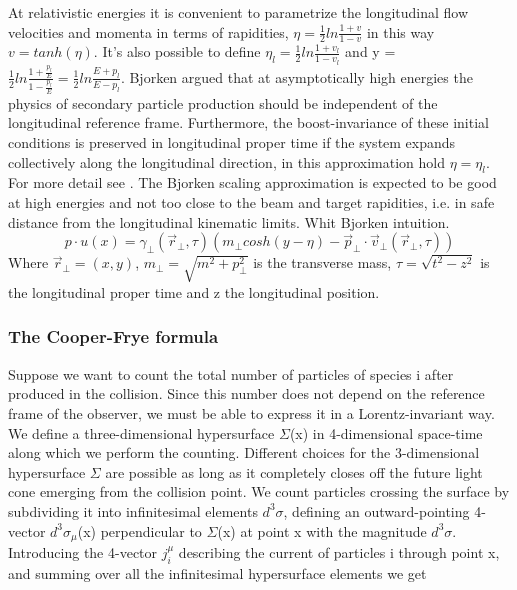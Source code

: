 \documentclass[12pt,a4paper]{book}
\begin{document}
	At relativistic energies it is convenient to parametrize the longitudinal flow velocities and momenta in terms of rapidities, $\eta= \frac{1}{2} ln \frac{1+v}{1-v}$ in this way $v = tanh (\eta)$. It's also possible to define $\eta_l = \frac{1}{2} ln \frac{1+v_l}{1-v_l}$ and y = $\frac{1}{2} ln \frac{1+\frac{p_l}{E}}{1-\frac{p_l}{E}}= \frac{1}{2} ln \frac{E+p_l}{E -p _l}$.  Bjorken argued that at asymptotically high energies the physics of secondary particle production should be independent of the longitudinal reference frame. Furthermore, the boost-invariance of these initial conditions is preserved in longitudinal proper time if the system expands collectively along the longitudinal direction, in this approximation hold $\eta=\eta_l$. For more detail see \cite{PhysRevD.27.140}. The Bjorken scaling approximation is expected to be good at high energies and not too close to the beam and target rapidities, i.e. in safe distance from the longitudinal kinematic limits. Whit Bjorken intuition.
	\begin{equation}
		p \cdot u(x) = \gamma_\perp(\vec{r}_\perp, \tau) \left(m_\perp cosh(y-\eta) - \vec{p}_\perp \cdot \vec{v}_\perp(\vec{r}_\perp, \tau) \right)
		\label{eq:p*u}
	\end{equation}
	Where $\vec{r}_\perp=(x,y)$, $m_\perp=\sqrt{m^2 + p_\perp^2}$ is the transverse mass, $\tau=\sqrt{t^2-z^2}$ is the longitudinal proper time and z the longitudinal position. 
	
	\subsubsection{The Cooper-Frye formula}
	
	Suppose we want to count the total number of particles of species i after produced in the collision. Since this number does not depend on the reference frame of the observer, we must be able to express it in a Lorentz-invariant way. We define a three-dimensional hypersurface $\Sigma$(x) in 4-dimensional space-time along which we perform the counting. Different choices for the 3-dimensional hypersurface $\Sigma$ are possible as long as it completely closes off the future light cone emerging from the collision point. We count particles crossing the surface by subdividing it into infinitesimal elements $d^3 \sigma$, defining an outward-pointing 4-vector $d^3 \sigma_\mu$(x) perpendicular to $\Sigma$(x) at point x with the magnitude $d^3 \sigma$. Introducing the 4-vector $j^\mu_i$ describing the current of particles i through point x, and summing over all the infinitesimal hypersurface elements we get
	
\end{document}
